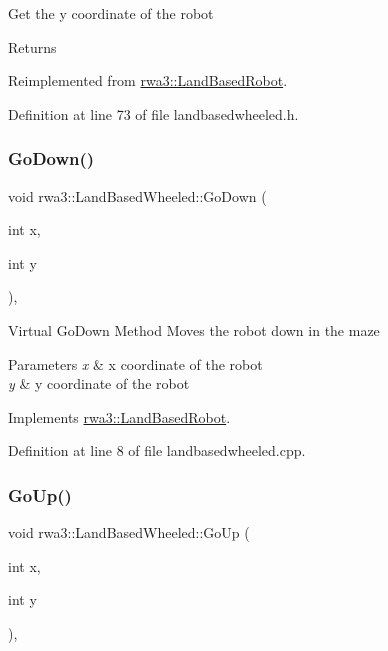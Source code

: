 Get the y coordinate of the robot \begin{DoxyReturn}{Returns}

\end{DoxyReturn}


Reimplemented from \hyperlink{classrwa3_1_1_land_based_robot_a6de17dafe355573275264f74a59f974d}{rwa3\+::\+Land\+Based\+Robot}.



Definition at line 73 of file landbasedwheeled.\+h.

\mbox{\label{classrwa3_1_1_land_based_wheeled_a20208be52afe9cdb302f288be3bb7608}} 
\subsubsection{\texorpdfstring{Go\+Down()}{GoDown()}}
{\footnotesize\ttfamily void rwa3\+::\+Land\+Based\+Wheeled\+::\+Go\+Down (\begin{DoxyParamCaption}\item[{int}]{x,  }\item[{int}]{y }\end{DoxyParamCaption})\hspace{0.3cm}{\ttfamily [override]}, {\ttfamily [virtual]}}

Virtual Go\+Down Method Moves the robot down in the maze 
\begin{DoxyParams}{Parameters}
{\em x} & x coordinate of the robot \\
\hline
{\em y} & y coordinate of the robot \\
\hline
\end{DoxyParams}


Implements \hyperlink{classrwa3_1_1_land_based_robot_a14fcb1b05297131cd09e8a57b8de0578}{rwa3\+::\+Land\+Based\+Robot}.



Definition at line 8 of file landbasedwheeled.\+cpp.

\mbox{\label{classrwa3_1_1_land_based_wheeled_a5feba1496039c50dd2d2f87fc286f438}} 
\subsubsection{\texorpdfstring{Go\+Up()}{GoUp()}}
{\footnotesize\ttfamily void rwa3\+::\+Land\+Based\+Wheeled\+::\+Go\+Up (\begin{DoxyParamCaption}\item[{int}]{x,  }\item[{int}]{y }\end{DoxyParamCaption})\hspace{0.3cm}{\ttfamily [override]}, {\ttfamily [virtual]}}

